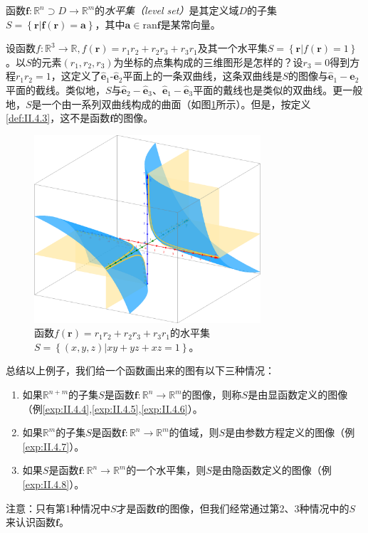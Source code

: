 \documentclass[main.tex]{subfiles}
\begin{document}
\begin{definition}[函数的水平集]\label{def:II.4.4}
    函数$\mathbf{f}:\mathbb{R}^n\supset D\rightarrow\mathbb{R}^m$的\emph{水平集（level set）}是其定义域$D$的子集$S=\left\{\mathbf{r}|\mathbf{f}\left(\mathbf{r}\right)=\mathbf{a}\right\}$，其中$\mathbf{a}\in\mathrm{ran}\mathbf{f}$是某常向量\cite[\S7.1]{华工高数2009下}。
\end{definition}
\begin{example}\label{exp:II.4.8}
    设函数$f:\mathbb{R}^3\rightarrow\mathbb{R},f\left(\mathbf{r}\right)=r_1r_2+r_2r_3+r_3r_1$及其一个水平集$S=\left\{\mathbf{r}|f\left(\mathbf{r}\right)=1\right\}$。以$S$的元素$\left(r_1,r_2,r_3\right)$为坐标的点集构成的三维图形是怎样的？设$r_3=0$得到方程$r_1r_2=1$，这定义了$\mathbf{\hat{e}}_1$-$\mathbf{\hat{e}}_2$平面上的一条双曲线，这条双曲线是$S$的图像与$\mathbf{\hat{e}}_1-\mathbf{\hat{e}}_2$平面的截线。类似地，$S$与$\mathbf{\hat{e}}_2-\mathbf{\hat{e}}_3$、$\mathbf{\hat{e}}_1-\mathbf{\hat{e}}_3$平面的戴线也是类似的双曲线。更一般地，$S$是一个由一系列双曲线构成的曲面（如图\ref{fig:II.4.5}所示）。但是，按定义\ref{def:II.4.3}，这不是函数$\mathbf{f}$的图像。
\end{example}
\begin{figure}[ht]
    \centering
    \includegraphics[width=0.75\textwidth]{images/II.4.5.png}
    \caption{函数$f\left(\mathbf{r}\right)=r_1r_2+r_2r_3+r_3r_1$的水平集$S=\left\{\left(x,y,z\right)|xy+yz+xz=1\right\}$。}
    \label{fig:II.4.5}
\end{figure}
总结以上例子，我们给一个函数画出来的图有以下三种情况：
\begin{enumerate}
    \item 如果$\mathbb{R}^{n+m}$的子集$S$是函数$\mathbf{f}:\mathbb{R}^n\rightarrow\mathbb{R}^m$的图像，则称$S$是由显函数定义的图像（例\ref{exp:II.4.4},\ref{exp:II.4.5},\ref{exp:II.4.6}）。
    \item 如果$\mathbb{R}^{m}$的子集$S$是函数$\mathbf{f}:\mathbb{R}^n\rightarrow\mathbb{R}^m$的值域，则$S$是由参数方程定义的图像（例\ref{exp:II.4.7}）。
    \item 如果$S$是函数$\mathbf{f}:\mathbb{R}^n\rightarrow\mathbb{R}^m$的一个水平集，则$S$是由隐函数定义的图像（例\ref{exp:II.4.8}）。
\end{enumerate}

注意：只有第1种情况中$S$才是函数$\mathbf{f}$的图像，但我们经常通过第2、3种情况中的$S$来认识函数$\mathbf{f}$。
\end{document}
